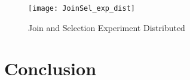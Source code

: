 \documentclass[11pt,a4paper,bibtotoc,idxtotoc,headsepline,footsepline,footexclude,BCOR12mm,DIV13]{scrbook}
\begin{document}

\begin{figure}
	\centering
	\texttt{[image: JoinSel\_exp\_dist]}
	\caption{Join and Selection Experiment Distributed}
	\label{sec:JoinSelExpDist}
	
\end{figure} 


\chapter{Conclusion}
\label{Conclusion}

\end{document}

